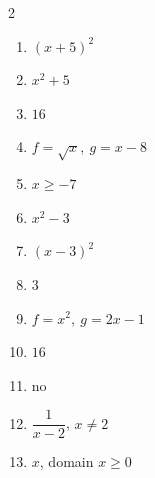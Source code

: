 \documentclass[11pt]{article}
\begin{document}
\begin{keybox}
\begin{multicols}{2}
\small
\begin{enumerate}[leftmargin=*,itemsep=3pt]
  \item $(x+5)^2$
  \item $x^2+5$
  \item $16$
  \item $f=\sqrt x,\ g=x-8$
  \item $x\ge-7$
  \item $x^2-3$
  \item $(x-3)^2$
  \item $3$
  \item $f=x^2,\ g=2x-1$
  \item $16$
  \item no
  \item $\dfrac{1}{x-2}$, $x\ne2$
  \item $x$, domain $x\ge0$
\end{enumerate}
\end{multicols}
\end{keybox}
\end{document}
